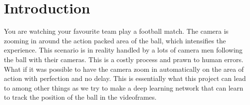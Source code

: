 
\section{Introduction}

You are watching your favourite team play a football match. The camera
is zooming in around the action packed area of the ball, which intensifies the experience.
This scenario is in reality handled by a lots of camera men
following the ball with their cameras. This is a costly process and
prawn to human errors. What if it was possible to have the camera
zoom in automatically on the area of action with perfection and
no delay. This is essentially what this project can lead to among
other things as we try to make a deep learning network that can learn to
track the position of the ball in the videoframes.
